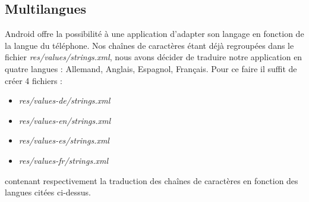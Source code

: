 \subsection{Multilangues}
Android offre la possibilité à une application d'adapter son langage en fonction
de la langue du téléphone. Nos chaînes de caractères étant déjà regroupées dans
le fichier \textit{res/values/strings.xml}, nous avons décider de traduire
notre application en quatre langues : Allemand, Anglais, Espagnol, Français.\newline
Pour ce faire il suffit de créer 4 fichiers :
\begin{itemize}
\item \textit{res/values-de/strings.xml}
\item \textit{res/values-en/strings.xml}
\item \textit{res/values-es/strings.xml}
\item \textit{res/values-fr/strings.xml}
\end{itemize}
contenant respectivement la traduction des chaînes de caractères en fonction des
langues citées ci-dessus.
